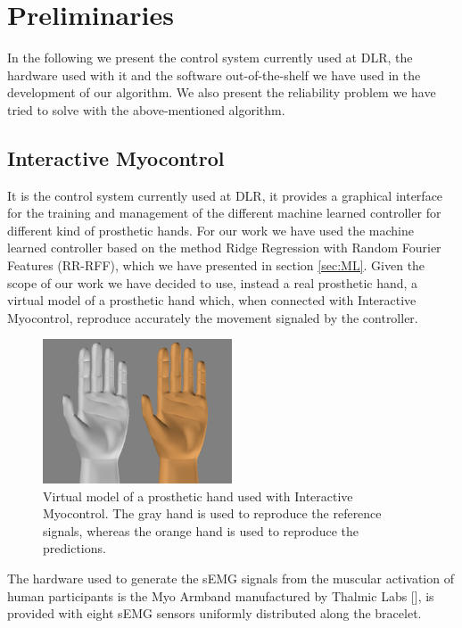 \chapter{Preliminaries}\label{ch:preliminaries}
In the following we present the control system currently used at DLR, the hardware used with it and the software out-of-the-shelf we have used in the development of our algorithm. We also present the reliability problem we have tried to solve with the above-mentioned algorithm. 
\section{Interactive Myocontrol}\label{sec:interactivemyocontrol}
It is the control system currently used at DLR, it provides a graphical interface for the training and management of the different machine learned controller for different kind of prosthetic hands. For our work we have used the machine learned controller based on the method Ridge Regression with Random Fourier Features (RR-RFF), which we have presented in section \ref{sec:ML}. Given the scope of our work we have decided to use, instead a real prosthetic hand, a virtual model of a prosthetic hand which, when connected with Interactive Myocontrol, reproduce accurately the movement signaled by the controller.
\begin{figure}[ht]
    \centering
    \includegraphics[width=0.5\textwidth]{Images/Blender.PNG}
    \caption{Virtual model of a prosthetic hand used with Interactive Myocontrol. The gray hand is used to reproduce the reference signals, whereas the orange hand is used to reproduce the predictions.}
    \label{fig:hand-blender}
\end{figure}
The hardware used to generate the sEMG signals from the muscular activation of human participants is the Myo Armband manufactured by Thalmic Labs [\cite{thalmic}], is provided with eight sEMG sensors uniformly distributed along the bracelet.
